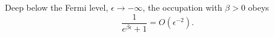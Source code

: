 \documentclass{article}
\begin{document}
Deep below the Fermi level, $\epsilon\to-\infty$, the occupation with $\beta>0$ obeys
\begin{equation}
\frac{1}{e^{\beta\epsilon}+1} = O(\epsilon^{-2}) .
\label{eq:tail}
\end{equation}
\end{document}
